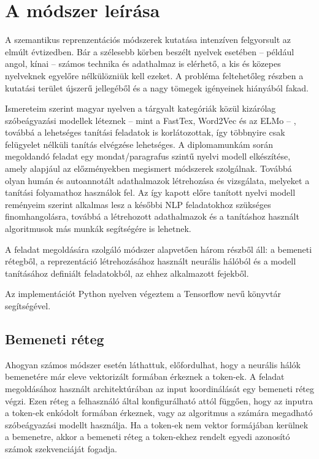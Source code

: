 \chapter{A módszer leírása}
\label{ch:method}

A szemantikus reprenzentációs módszerek kutatása intenzíven felgyorsult az elmúlt évtizedben. Bár a szélesebb körben beszélt nyelvek esetében – például angol, kínai – számos technika és adathalmaz is elérhető, a kis és közepes nyelveknek egyelőre nélkülözniük kell ezeket. A probléma  feltehetőleg részben a kutatási terület újszerű jellegéből és a nagy tömegek igényeinek hiányából fakad. 

Ismereteim szerint magyar nyelven a tárgyalt kategóriák közül kizárólag szóbeágyazási modellek léteznek – mint a FastTex, Word2Vec és az ELMo – , továbbá a lehetséges tanítási feladatok is korlátozottak, így többnyire csak felügyelet nélküli tanítás elvégzése lehetséges. A diplomamunkám során megoldandó feladat egy mondat/paragrafus szintű nyelvi modell elkészítése, amely alapjául az előzményekben megismert módszerek szolgálnak. Továbbá olyan humán és autoannotált adathalmazok létrehozása és vizsgálata, melyeket a tanítási folyamathoz használok fel. Az így kapott előre tanított nyelvi modell reményeim szerint alkalmas lesz a későbbi NLP feladatokhoz szükséges finomhangolásra, továbbá a létrehozott adathalmazok és a tanításhoz használt algoritmusok más munkák segítségére is lehetnek.

A feladat megoldására szolgáló módszer alapvetően három részből áll: a bemeneti rétegből, a reprezentáció létrehozásához használt neurális hálóból és a modell tanításához definiált feladatokból, az ehhez alkalmazott fejekből.

Az implementációt Python nyelven végeztem a Tensorflow nevű könyvtár segítségével.

\section{Bemeneti réteg}

Ahogyan számos módszer esetén láthattuk, előfordulhat, hogy a neurális hálók bemenetére már eleve vektorizált formában érkeznek a token-ek. A feladat megoldásához használt architektúrában az input koordinálását egy bemeneti réteg végzi. Ezen réteg a felhasználó által konfigurálható attól függően, hogy az inputra a token-ek enkódolt formában érkeznek, vagy az algoritmus a számára megadható szóbeágyazási modellt használja. Ha a token-ek nem vektor formájában kerülnek a bemenetre, akkor a bemeneti réteg a token-ekhez rendelt egyedi azonosító számok szekvenciáját fogadja.

